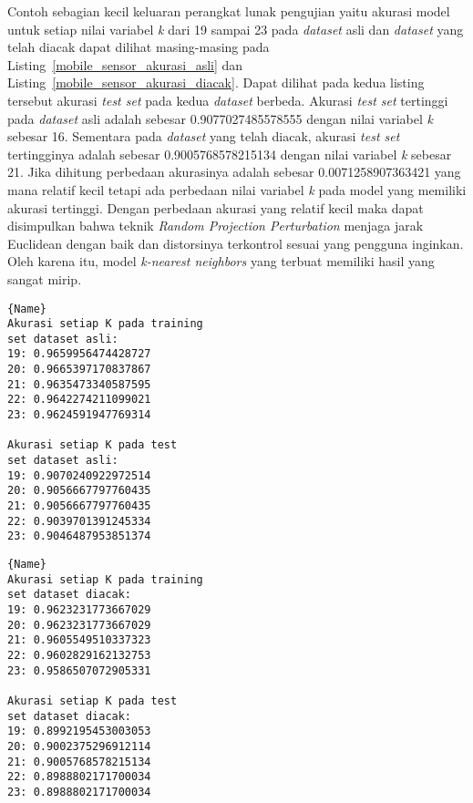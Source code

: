 Contoh sebagian kecil keluaran perangkat lunak pengujian yaitu akurasi model untuk setiap nilai variabel \textit{k} dari 19 sampai 23 pada \textit{dataset} asli dan \textit{dataset} yang telah diacak dapat dilihat masing-masing pada Listing~\ref{mobile_sensor_akurasi_asli} dan Listing~\ref{mobile_sensor_akurasi_diacak}. Dapat dilihat pada kedua listing tersebut akurasi \textit{test set} pada kedua \textit{dataset} berbeda. Akurasi \textit{test set} tertinggi pada \textit{dataset} asli adalah sebesar 0.9077027485578555 dengan nilai variabel \textit{k} sebesar 16. Sementara pada \textit{dataset} yang telah diacak, akurasi \textit{test set} tertingginya adalah sebesar 0.9005768578215134 dengan nilai variabel \textit{k} sebesar 21. Jika dihitung perbedaan akurasinya adalah sebesar 0.0071258907363421 yang mana relatif kecil tetapi ada perbedaan nilai variabel \textit{k} pada model yang memiliki akurasi tertinggi. Dengan perbedaan akurasi yang relatif kecil maka dapat disimpulkan bahwa teknik \textit{Random Projection Perturbation} menjaga jarak Euclidean dengan baik dan distorsinya terkontrol sesuai yang pengguna inginkan. Oleh karena itu, model \textit{k-nearest neighbors} yang terbuat memiliki hasil yang sangat mirip.
	
\noindent\begin{minipage}{.48\textwidth}
	\begin{lstlisting}[caption=\textit{Dataset mobile\_sensor} Asli,frame=tlrb, label=mobile_sensor_akurasi_asli]{Name}
Akurasi setiap K pada training 
set dataset asli: 
19: 0.9659956474428727
20: 0.9665397170837867
21: 0.9635473340587595
22: 0.9642274211099021
23: 0.9624591947769314

Akurasi setiap K pada test 
set dataset asli: 
19: 0.9070240922972514
20: 0.9056667797760435
21: 0.9056667797760435
22: 0.9039701391245334
23: 0.9046487953851374
	\end{lstlisting}
	\end{minipage}\hfill
	\begin{minipage}{.48\textwidth}
	\begin{lstlisting}[caption=\textit{Dataset mobile\_sensor} Diacak,frame=tlrb, label=mobile_sensor_akurasi_diacak]{Name}
Akurasi setiap K pada training 
set dataset diacak: 
19: 0.9623231773667029
20: 0.9623231773667029
21: 0.9605549510337323
22: 0.9602829162132753
23: 0.9586507072905331

Akurasi setiap K pada test 
set dataset diacak: 
19: 0.8992195453003053
20: 0.9002375296912114
21: 0.9005768578215134
22: 0.8988802171700034
23: 0.8988802171700034
	\end{lstlisting}
\end{minipage}

